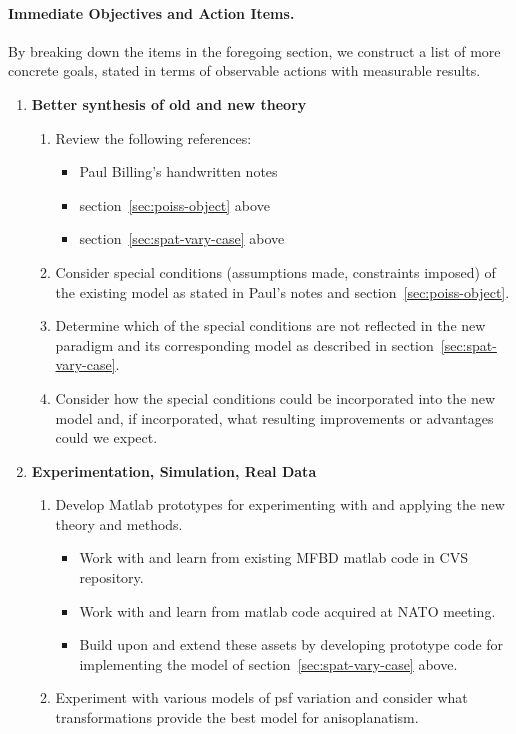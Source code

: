 \paragraph{Immediate Objectives and Action Items.} By breaking down the items
in the foregoing section, we construct a list of more concrete goals, stated
in terms of observable actions with measurable results. 
\begin{enumerate}
\item {\bf Better synthesis of old and new theory}
\begin{enumerate}
\item Review the following references:
\begin{itemize}
\item Paul Billing's handwritten notes\label{item:revref1}
\item section~\ref{sec:poiss-object} above
\item section~\ref{sec:spat-vary-case} above
\end{itemize}
\item Consider special conditions (\eg assumptions made, constraints imposed)
  of the existing model as stated in Paul's notes and section~\ref{sec:poiss-object}.
\item Determine which of the special conditions are not reflected in the new paradigm
 and its corresponding model as described in section~\ref{sec:spat-vary-case}.
\item Consider how the special conditions could be incorporated into the new
  model and, if incorporated, what resulting improvements or advantages could
  we expect.
\end{enumerate}
\item {\bf Experimentation, Simulation, Real Data}
\begin{enumerate}
\item Develop Matlab prototypes for experimenting with and applying the new theory and methods. 
\begin{itemize}
\item Work with and learn from existing MFBD matlab code in CVS repository.
\item Work with and learn from matlab code acquired at NATO meeting.
\item Build upon and extend these assets by developing prototype code for
  implementing the model of section~\ref{sec:spat-vary-case} above. 
\end{itemize}
\item Experiment with various models of psf variation and consider what
  transformations provide the best model for anisoplanatism. 
\end{enumerate}
\end{enumerate}

